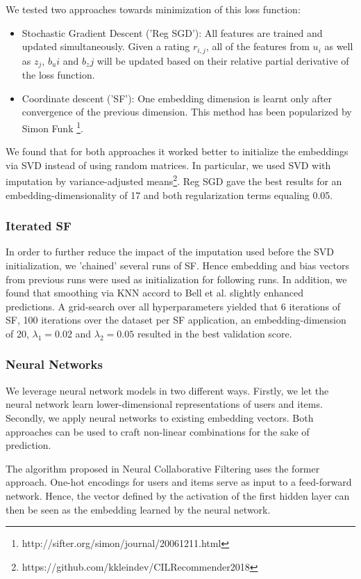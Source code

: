 \documentclass[10pt,conference,compsocconf]{IEEEtran}
\begin{document}
We tested two approaches towards minimization of this loss function:
\begin{itemize}
\item Stochastic Gradient Descent ('Reg SGD'):
All features are trained and updated simultaneously. Given a rating $r_{i,j}$, all of the features from $u_i$ as well as $z_j$, $b_ui$ and $b_zj$ will be updated based on their relative partial derivative of the loss function.
\item Coordinate descent ('SF'):
One embedding dimension is learnt only after convergence of the previous dimension. This method has been popularized by Simon Funk \footnote{http://sifter.org/simon/journal/20061211.html}.
\end{itemize}
We found that for both approaches it worked better to initialize the embeddings via SVD instead of using random matrices. In particular, we used SVD with imputation by variance-adjusted means\footnote{https://github.com/kkleindev/CILRecommender2018}. Reg SGD gave the best results for an embedding-dimensionality of 17 and both regularization terms equaling 0.05.

\subsubsection{Iterated SF}
In order to further reduce the impact of the imputation used before the SVD initialization, we 'chained' several runs of SF. Hence embedding and bias vectors from previous runs were used as initialization for following runs. In addition, we found that smoothing via KNN accord to Bell et al. \cite{bell2007improved} slightly enhanced predictions. A grid-search over all hyperparameters yielded that 6 iterations of SF, 100 iterations over the dataset per SF application, an embedding-dimension of 20, $\lambda_1 = 0.02$ and $\lambda_2 = 0.05$ resulted in the best validation score.

\subsubsection{Neural Networks}
We leverage neural network models in two different ways. Firstly, we let the neural network learn lower-dimensional representations of users and items. Secondly, we apply neural networks to existing embedding vectors. Both approaches can be used to craft non-linear combinations for the sake of prediction.

The algorithm proposed in Neural Collaborative Filtering \cite{he2017neural} uses the former approach. One-hot encodings for users and items serve as input to a feed-forward network. Hence, the vector defined by the activation of the first hidden layer can then be seen as the embedding learned by the neural network.
\end{document}

